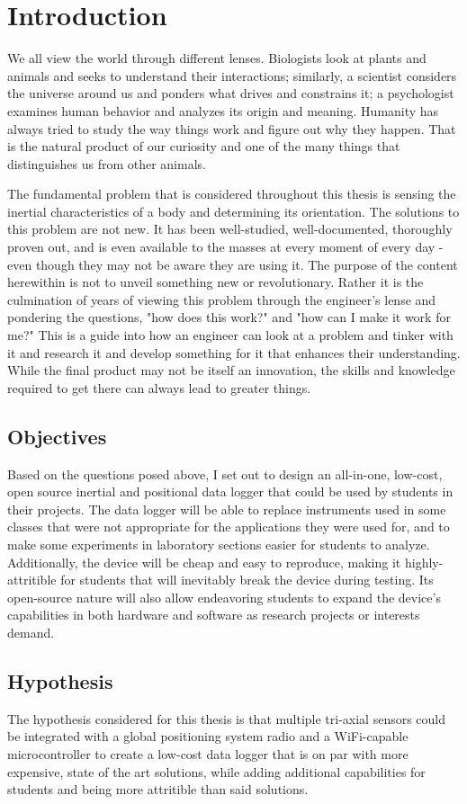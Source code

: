 \chapter{Introduction}\label{chap:intro}
We all view the world through different lenses.
Biologists look at plants and animals and seeks to understand their interactions;
similarly, a scientist considers the universe around us and ponders what drives and constrains it;
a psychologist examines human behavior and analyzes its origin and meaning.
Humanity has always tried to study the way things work and figure out why they happen.
That is the natural product of our curiosity and one of the many things that distinguishes us from other animals.

The fundamental problem that is considered throughout this thesis is sensing the inertial characteristics of a body and determining its orientation.
The solutions to this problem are not new.
It has been well-studied, well-documented, thoroughly proven out, and is even available to the masses at every moment of every day - even though they may not be aware they are using it.
The purpose of the content herewithin is not to unveil something new or revolutionary.
Rather it is the culmination of years of viewing this problem through the engineer's lense and pondering the questions, "how does this work?" and "how can I make it work for me?"
This is a guide into how an engineer can look at a problem and tinker with it and research it and develop something for it that enhances their understanding.
While the final product may not be itself an innovation, the skills and knowledge required to get there can always lead to greater things.

\section{Objectives}
Based on the questions posed above, I set out to design an all-in-one, low-cost, open source inertial and positional data logger that could be used by students in their projects.
The data logger will be able to replace instruments used in some classes that were not appropriate for the applications they were used for, and to make some experiments in laboratory sections easier for students to analyze.
Additionally, the device will be cheap and easy to reproduce, making it highly-attritible for students that will inevitably break the device during testing.
Its open-source nature will also allow endeavoring students to expand the device's capabilities in both hardware and software as research projects or interests demand.

\section{Hypothesis}
The hypothesis considered for this thesis is that multiple tri-axial sensors could be integrated with a global positioning system radio and a WiFi-capable microcontroller to create a low-cost data logger that is on par with more expensive, state of the art solutions, while adding additional capabilities for students and being more attritible than said solutions.
